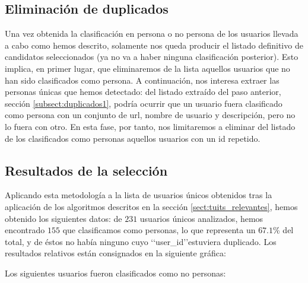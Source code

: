 \subsection{Eliminación de duplicados}
\label{subsect:duplicados2}
Una vez obtenida la clasificación en persona o no persona de los usuarios llevada a cabo como
hemos descrito, solamente nos queda producir el listado definitivo de candidatos seleccionados 
(ya no va a haber ninguna clasificación posterior). Esto implica, en primer lugar, que eliminaremos
de la lista aquellos usuarios que no han sido clasificados como persona. A continuación, nos interesa
extraer las personas únicas que hemos detectado: del listado extraído del paso anterior, 
sección \ref{subsect:duplicados1}, podría ocurrir que un usuario  fuera clasificado como persona con un
conjunto de url, nombre de usuario y descripción, pero no lo fuera con otro. En esta fase, por tanto, nos limitaremos a eliminar del listado de los clasificados como personas aquellos usuarios con un id repetido.

\subsection{Resultados de la selección}
Aplicando esta metodología a la lista de usuarios únicos obtenidos tras la aplicación
de los algoritmos descritos en la sección \ref{sect:tuits_relevantes}, 
hemos obtenido los siguientes datos: de $231$ usuarios únicos analizados, 
hemos encontrado $155$ que clasificamos como 
personas, lo que representa un $67.1$\%  del total, y de éstos
no había ninguno cuyo \lq\lq user\_id\rq\rq estuviera duplicado. Los resultados relativos están consignados en la siguiente gráfica:



Los siguientes usuarios fueron clasificados como no personas:




